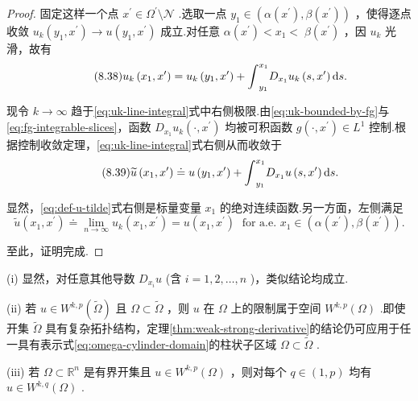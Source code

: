 \begin{proof}
固定这样一个点 ${x}^{\prime } \in  {\Omega }^{\prime } \setminus  \mathcal{N}$ .选取一点 ${y}_{1} \in  ( \alpha \left( {x}^{\prime }\right) ,\beta \left( {x}^{\prime }\right) )$ ，使得逐点收敛 ${u}_{k}\left( {{y}_{1},{x}^{\prime }}\right)  \rightarrow  u\left( {{y}_{1},{x}^{\prime }}\right)$ 成立.对任意 $\alpha \left( {x}^{\prime }\right)  < {x}_{1} < \; \beta \left( {x}^{\prime }\right)$ ，因 ${u}_{k}$ 光滑，故有
\begin{equation}\tag{8.38}\label{eq:uk-line-integral}
{u}_{k}\left( {{x}_{1},{x}^{\prime }}\right)  = {u}_{k}\left( {{y}_{1},{x}^{\prime }}\right)  + {\int }_{{y}_{1}}^{{x}_{1}}{D}_{{x}_{1}}{u}_{k}\left( {s,{x}^{\prime }}\right) {\mathop{}\!\mathrm{d} s}.
\end{equation}

现令 $k \rightarrow  \infty$ 趋于\eqref{eq:uk-line-integral}式中右侧极限.由\eqref{eq:uk-bounded-by-fg}与\eqref{eq:fg-integrable-slices}，函数 ${D}_{{x}_{1}}{u}_{k}\left( {\cdot ,{x}^{\prime }}\right)$ 均被可积函数 $g\left( {\cdot ,{x}^{\prime }}\right)  \in  {L}^{1}$ 控制.根据控制收敛定理，\eqref{eq:uk-line-integral}式右侧从而收敛于
\begin{equation}\tag{8.39}\label{eq:def-u-tilde}
\widetilde{u}\left( {{x}_{1},{x}^{\prime }}\right)  \doteq  u\left( {{y}_{1},{x}^{\prime }}\right)  + {\int }_{{y}_{1}}^{{x}_{1}}{D}_{{x}_{1}}u\left( {s,{x}^{\prime }}\right) {\mathop{}\!\mathrm{d} s}.
\end{equation}

显然，\eqref{eq:def-u-tilde}式右侧是标量变量 ${x}_{1}$ 的绝对连续函数.另一方面，左侧满足
\[
\widetilde{u}\left( {{x}_{1},{x}^{\prime }}\right)  \doteq  \mathop{\lim }\limits_{{n \rightarrow  \infty }}{u}_{k}\left( {{x}_{1},{x}^{\prime }}\right)  = u\left( {{x}_{1},{x}^{\prime }}\right) \;\text{ for a.e. }{x}_{1} \in  \left(  {\alpha \left( {x}^{\prime }\right) ,\beta \left( {x}^{\prime }\right) }\right)  .
\]

至此，证明完成.
\end{proof}

\begin{remark}\label{rem:weak-strong-derivative}
(i) 显然，对任意其他导数 ${D}_{{x}_{i}}u$ (含 $i = 1,2,\ldots ,n$ )，类似结论均成立.

(ii) 若 $u \in  {W}^{k,p}\left( \widetilde{\Omega }\right)$ 且 $\Omega  \subset  \widetilde{\Omega }$ ，则 $u$ 在 $\Omega$ 上的限制属于空间 ${W}^{k,p}\left( \Omega \right)$ .即使开集 $\widetilde{\Omega }$ 具有复杂拓扑结构，定理\ref{thm:weak-strong-derivative}的结论仍可应用于任一具有表示式\eqref{eq:omega-cylinder-domain}的柱状子区域 $\Omega  \subset  \widetilde{\Omega }$ .

(iii) 若 $\Omega  \subset  {\mathbb{R}}^{n}$ 是有界开集且 $u \in  {W}^{k,p}\left( \Omega \right)$ ，则对每个 $q \in  \left(  {1,p}\right)$ 均有 $u \in  {W}^{k,q}\left( \Omega \right)$ .

\end{remark}

